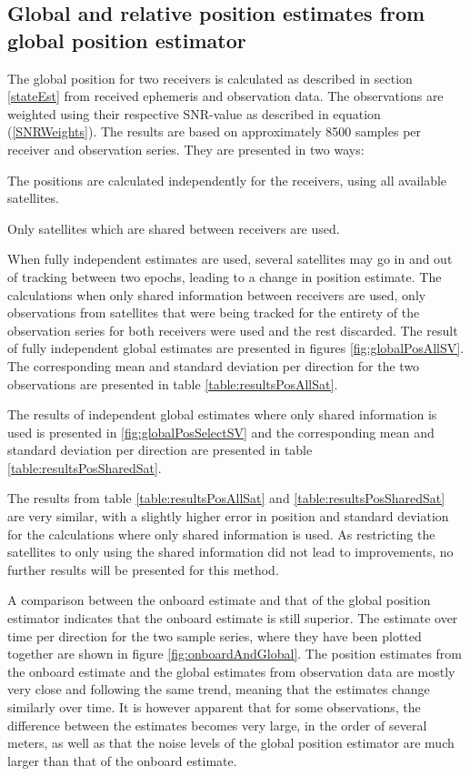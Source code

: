 \subsection{Global and relative position estimates from global position estimator}\label{leastSquareEstimator}
The global position for two receivers is calculated as described in section \ref{stateEst} from received ephemeris and observation data. The observations are weighted using their respective SNR-value as described in equation (\ref{SNRWeights}).
The results are based on approximately 8500 samples per receiver and observation series. They are presented in two ways:
\begin{itemize}
\begin{samepage}
\item The positions are calculated independently for the receivers, using all available satellites.
\item Only satellites which are shared between receivers are used.
\end{samepage}
\end{itemize}
When fully independent estimates are used, several satellites may go in and out of tracking between two epochs, leading to a change in position estimate. The calculations when only shared information between receivers are used, only observations from satellites that were being tracked for the entirety of the observation series for both receivers were used and the rest discarded. The result of fully independent global estimates are presented in figures \ref{fig:globalPosAllSV}. The corresponding mean and standard deviation per direction for the two observations are presented in table \ref{table:resultsPosAllSat}. 
\par
The results of independent global estimates where only shared information is used is presented in \ref{fig:globalPosSelectSV} and the corresponding mean and standard deviation per direction are presented in table \ref{table:resultsPosSharedSat}. 
\par
The results from table \ref{table:resultsPosAllSat} and \ref{table:resultsPosSharedSat} are very similar, with a slightly higher error in position and standard deviation for the calculations where only shared information is used. As restricting the satellites to only using the shared information did not lead to improvements, no further results will be presented for this method.
\par
A comparison between the onboard estimate and that of the global position estimator indicates that the onboard estimate is still superior. The estimate over time per direction for the two sample series, where they have been plotted together are shown in figure \ref{fig:onboardAndGlobal}. The position estimates from the onboard estimate and the global estimates from observation data are mostly very close and following the same trend, meaning that the estimates change similarly over time. It is however apparent that for some observations, the difference between the estimates becomes very large, in the order of several meters, as well as that the noise levels of the global position estimator are much larger than that of the onboard estimate. 
